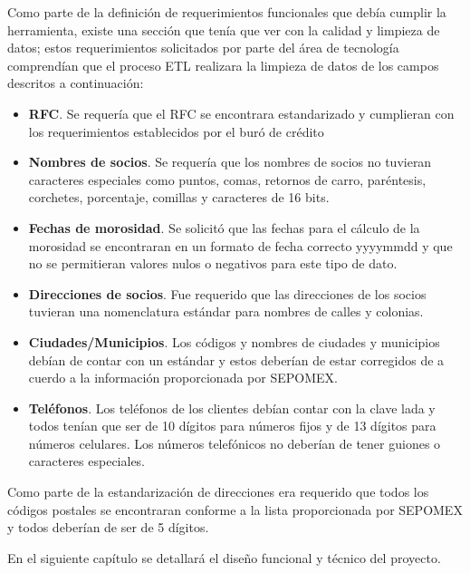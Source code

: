 Como parte de la definición de requerimientos funcionales que debía cumplir la
herramienta, existe una sección que tenía que ver con la calidad y limpieza de
datos; estos requerimientos solicitados por parte del área de tecnología
comprendían que el proceso ETL realizara la limpieza de datos de los campos
descritos a continuación:

\begin{itemize}

\item \textbf{RFC}. Se requería que el RFC se encontrara estandarizado y
  cumplieran con los requerimientos establecidos por el buró de crédito

\item \textbf{Nombres de socios}. Se requería que los nombres de socios no
  tuvieran caracteres especiales como puntos, comas, retornos de carro,
  paréntesis, corchetes, porcentaje, comillas y caracteres de 16 bits.

\item \textbf{Fechas de morosidad}. Se solicitó que las fechas para el cálculo
  de la morosidad se encontraran en un formato de fecha correcto yyyymmdd y que
  no se permitieran valores nulos o negativos para este tipo de dato.

\item \textbf{Direcciones de socios}. Fue requerido que las direcciones de los
  socios tuvieran una nomenclatura estándar para nombres de calles y colonias.

\item \textbf{Ciudades/Municipios}. Los códigos y nombres de ciudades y
  municipios debían de contar con un estándar y estos deberían de estar
  corregidos de a cuerdo a la información proporcionada por SEPOMEX.

\item \textbf{Teléfonos}. Los teléfonos de los clientes debían contar con la
  clave lada y todos tenían que ser de 10 dígitos para números fijos y de 13
  dígitos para números celulares. Los números telefónicos no deberían de tener
  guiones o caracteres especiales.

\end{itemize}

Como parte de la estandarización de direcciones era requerido que todos los
códigos postales se encontraran conforme a la lista proporcionada por SEPOMEX y
todos deberían de ser de 5 dígitos.

En el siguiente capítulo se detallará el diseño funcional y técnico del
proyecto.

\cleardoublepage

